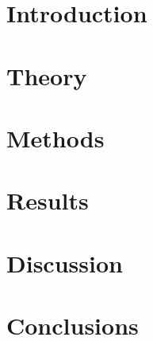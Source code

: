 \documentclass[a4paper, 12pt, openany]{book} %
\begin{document}

\pagestyle{fancy} %
\fancyhf{} %
\renewcommand{\headrulewidth}{0pt} %
\fancyhead[LE, RO]{\thepage} %
\fancyhead[RE, LO]{\leftmark} %
\setlength{\headheight}{14.49998pt} %



\chapter{Introduction}

\clearpage


\chapter{Theory}

\clearpage


\chapter{Methods}

\clearpage

\chapter{Results}

\clearpage


\chapter{Discussion}

\clearpage


\chapter{Conclusions}

\clearpage
\end{document}

